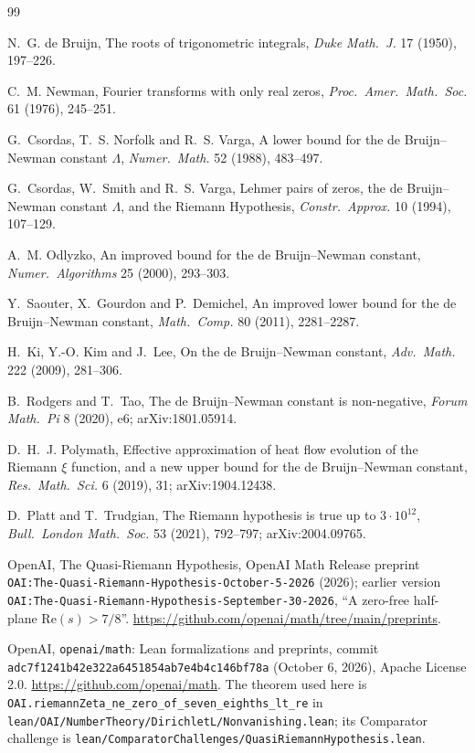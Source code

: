 \documentclass[11pt]{article}
\theoremstyle{definition}
\begin{document}
\begin{thebibliography}{99}\small

 N.~G. de Bruijn, The roots of trigonometric integrals, \emph{Duke Math.\ J.} 17 (1950), 197--226.

 C.~M. Newman, Fourier transforms with only real zeros, \emph{Proc.\ Amer.\ Math.\ Soc.} 61 (1976), 245--251.

 G.~Csordas, T.~S. Norfolk and R.~S. Varga, A lower bound for the de Bruijn--Newman constant $\Lambda$, \emph{Numer.\ Math.} 52 (1988), 483--497.

 G.~Csordas, W.~Smith and R.~S. Varga, Lehmer pairs of zeros, the de Bruijn--Newman constant $\Lambda$, and the Riemann Hypothesis, \emph{Constr.\ Approx.} 10 (1994), 107--129.

 A.~M. Odlyzko, An improved bound for the de Bruijn--Newman constant, \emph{Numer.\ Algorithms} 25 (2000), 293--303.

 Y.~Saouter, X.~Gourdon and P.~Demichel, An improved lower bound for the de Bruijn--Newman constant, \emph{Math.\ Comp.} 80 (2011), 2281--2287.

 H.~Ki, Y.-O. Kim and J.~Lee, On the de Bruijn--Newman constant, \emph{Adv.\ Math.} 222 (2009), 281--306.

 B.~Rodgers and T.~Tao, The de Bruijn--Newman constant is non-negative, \emph{Forum Math.\ Pi} 8 (2020), e6; arXiv:1801.05914.

 D.~H.~J. Polymath, Effective approximation of heat flow evolution of the Riemann $\xi$ function, and a new upper bound for the de Bruijn--Newman constant, \emph{Res.\ Math.\ Sci.} 6 (2019), 31; arXiv:1904.12438.

 D.~Platt and T.~Trudgian, The Riemann hypothesis is true up to $3 \cdot 10^{12}$, \emph{Bull.\ London Math.\ Soc.} 53 (2021), 792--797; arXiv:2004.09765.

 OpenAI, The Quasi-Riemann Hypothesis, OpenAI Math Release preprint \texttt{OAI:The-Quasi-Riemann-Hypothesis-October-5-2026} (2026); earlier version \texttt{OAI:The-Quasi-Riemann-Hypothesis-September-30-2026}, ``A zero-free half-plane $\mathrm{Re}(s) > 7/8$''. \url{https://github.com/openai/math/tree/main/preprints}.

 OpenAI, \texttt{openai/math}: Lean formalizations and preprints, commit \texttt{adc7f1241b42e322a6451854ab7e4b4c146bf78a} (October 6, 2026), Apache License 2.0. \url{https://github.com/openai/math}. The theorem used here is \texttt{OAI.riemannZeta\_ne\_zero\_of\_seven\_eighths\_lt\_re} in \texttt{lean/OAI/NumberTheory/DirichletL/Nonvanishing.lean}; its Comparator challenge is \texttt{lean/ComparatorChallenges/QuasiRiemannHypothesis.lean}.


\end{thebibliography}
\end{document}

